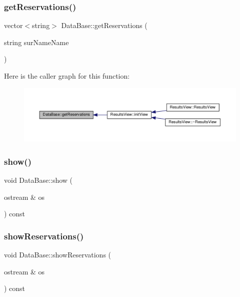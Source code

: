 \subsubsection{\texorpdfstring{get\+Reservations()}{getReservations()}}
{\footnotesize\ttfamily vector$<$string$>$ Data\+Base\+::get\+Reservations (\begin{DoxyParamCaption}\item[{string}]{sur\+Name\+Name }\end{DoxyParamCaption})\hspace{0.3cm}{\ttfamily [inline]}}

Here is the caller graph for this function\+:\nopagebreak
\begin{figure}[H]
\begin{center}
\leavevmode
\includegraphics[width=350pt]{class_data_base_a8e5b464d772e7cdac7c10b5548fef1b2_icgraph}
\end{center}
\end{figure}
\mbox{\label{class_data_base_a47afe882e3b264b43e8cb4bf3f894a68}} 
\subsubsection{\texorpdfstring{show()}{show()}}
{\footnotesize\ttfamily void Data\+Base\+::show (\begin{DoxyParamCaption}\item[{ostream \&}]{os }\end{DoxyParamCaption}) const\hspace{0.3cm}{\ttfamily [inline]}}

\mbox{\label{class_data_base_a8ea4492457e052838b3b9d41c00d786d}} 
\subsubsection{\texorpdfstring{show\+Reservations()}{showReservations()}}
{\footnotesize\ttfamily void Data\+Base\+::show\+Reservations (\begin{DoxyParamCaption}\item[{ostream \&}]{os }\end{DoxyParamCaption}) const\hspace{0.3cm}{\ttfamily [inline]}}

